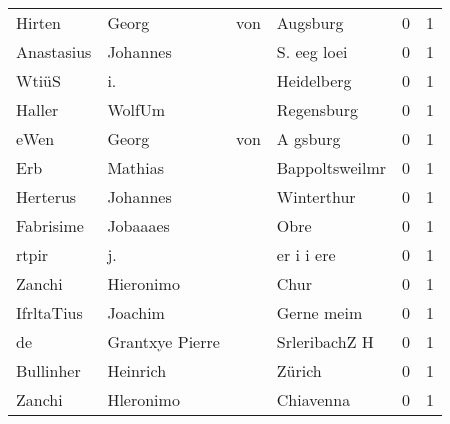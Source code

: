 \begin{center}
\begin{tiny}
\begin{longtabu}{llllrr}
                   Hirten &                              Georg &         von &                                    Augsburg &          0 &         1 \\
               Anastasius &                           Johannes &             &                                 S. eeg loei &          0 &         1 \\
                    WtiüS &                                 i. &             &                                  Heidelberg &          0 &         1 \\
                   Haller &                             WolfUm &             &                                  Regensburg &          0 &         1 \\
                     eWen &                              Georg &         von &                                    A gsburg &          0 &         1 \\
                      Erb &                            Mathias &             &                              Bappoltsweilmr &          0 &         1 \\
                 Herterus &                           Johannes &             &                                  Winterthur &          0 &         1 \\
                Fabrisime &                           Jobaaaes &             &                                        Obre &          0 &         1 \\
                    rtpir &                                 j. &             &                                  er i i ere &          0 &         1 \\
                   Zanchi &                          Hieronimo &             &                                        Chur &          0 &         1 \\
               IfrltaTius &                            Joachim &             &                                  Gerne meim &          0 &         1 \\
                       de &                    Grantxye Pierre &             &                               SrleribachZ H &          0 &         1 \\
                Bullinher &                           Heinrich &             &                                      Zürich &          0 &         1 \\
                   Zanchi &                          Hleronimo &             &                                   Chiavenna &          0 &         1 \\

\end{longtabu}
\end{tiny}
\end{center}
